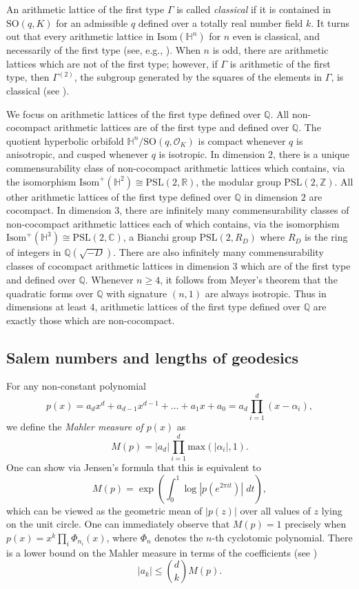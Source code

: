 \documentclass[12pt]{amsart}
\newcommand{\SO}{\mathrm{SO}}
\newcommand{\C}{\mathbb{C}}
\renewcommand{\H}{\mathbb{H}}
\newcommand{\Q}{\mathbb{Q}}
\newcommand{\Z}{\mathbb{Z}}
\newcommand{\R}{\mathbb{R}}
\newcommand{\PSL}{\mathrm{PSL}}
\theoremstyle{plain}
\begin{document}
An arithmetic lattice of the first type $\Gamma$ is called \emph{classical} if it is contained in $\SO(q,K)$ for an admissible $q$ defined over a totally real number field $k$. It turns out that every arithmetic lattice in $\mathrm{Isom}(\H^n)$ for $n$ even is classical, and necessarily of the first type (see, e.g., \cite[Lemma 4.2]{EmeryRatcliffeTschantz}). When $n$ is odd, there are arithmetic lattices which are not of the first type; however, if $\Gamma$ is arithmetic of the first type, then $\Gamma^{(2)}$, the subgroup generated by the squares of the elements in $\Gamma$, is classical (see \cite[Lemma 4.5]{EmeryRatcliffeTschantz}).

We focus on arithmetic lattices of the first type defined over $\Q$. All non-cocompact arithmetic lattices are of the first type and defined over $\Q$. The quotient hyperbolic orbifold $\H^n/\SO(q,\mathcal{O}_K)$ is compact whenever $q$ is anisotropic, and cusped whenever $q$ is isotropic. In dimension $2$, there is a unique commensurability class of non-cocompact arithmetic lattices which contains, via the isomorphism $\mathrm{Isom}^+(\H^2)\cong\PSL(2,\R)$, the modular group $\PSL(2,\Z)$. All other arithmetic lattices of the first type defined over $\Q$ in dimension $2$ are cocompact.
In dimension $3$, there are infinitely many commensurability classes of non-cocompact arithmetic lattices each of which contains, via the isomorphism $\mathrm{Isom}^+(\H^3)\cong\PSL(2,\C)$, a Bianchi group $\PSL(2,R_D)$ where $R_D$ is the ring of integers in $\Q(\sqrt{-D})$. There are also infinitely many commensurability classes of cocompact arithmetic lattices in dimension $3$ which are of the first type and defined over $\Q$.
Whenever $n\geq 4$, it follows from Meyer's theorem that the quadratic forms over $\Q$ with signature $(n,1)$ are always isotropic. Thus in dimensions at least $4$, arithmetic lattices of the first type defined over $\Q$ are exactly those which are non-cocompact.



\subsection{Salem numbers and lengths of geodesics}
For any non-constant polynomial
\[ p(x)=a_dx^d+a_{d-1}x^{d-1}+\dots + a_1x+a_0= a_{d} \prod_{i=1}^d (x-\alpha_i ),\]
we define the \textit{Mahler measure of $p(x)$} as
\[ M(p) = |a_{d}| \prod_{i=1}^d \mathrm{max}(|\alpha_i|,1).\]
One can show via Jensen's formula that this is equivalent to
\[
M(p)=\exp\left( \int_0^1 \log |p(e^{2\pi i t})|\; dt \right),
\]
 which can be viewed as the geometric mean of $|p(z)|$ over all values of $z$ lying on the unit circle. One can immediately observe that $M(p) = 1$ precisely when $p(x) = x^k \displaystyle\prod_i \Phi_{n_i}(x)$, where $\Phi_n$ denotes the $n$-th cyclotomic polynomial. There is a lower bound on the Mahler measure in terms of the coefficients (see \cite[\S 2]{Mahler})
 \begin{equation}\label{eq:coeffbound}
     |a_k|\leq \binom{d}{k}M(p) . 
 \end{equation} 
\end{document}
